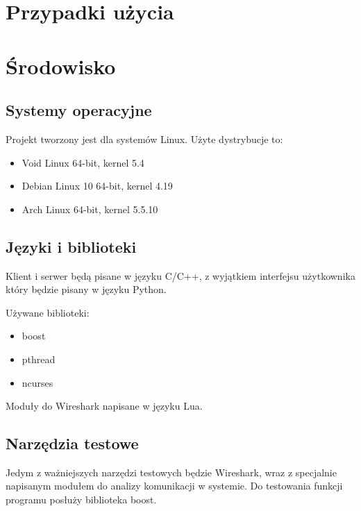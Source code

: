 \documentclass{article}
\begin{document}
\section{Przypadki użycia\label{przyp}}



\section{Środowisko\label{srod}}

\subsection{Systemy operacyjne}

Projekt tworzony jest dla systemów Linux. Użyte dystrybucje to:
\begin{itemize}

\item Void Linux 64-bit, kernel 5.4
\item Debian Linux 10 64-bit, kernel 4.19
\item Arch Linux 64-bit, kernel 5.5.10

\end{itemize}

\subsection{Języki i biblioteki}

Klient i serwer będą pisane w języku C/C++, z wyjątkiem interfejsu użytkownika który będzie pisany w języku Python.

Używane biblioteki:
\begin{itemize}

\item boost
\item pthread
\item ncurses
  
\end{itemize}


Moduły do Wireshark napisane w języku Lua.

\subsection{Narzędzia testowe}

Jedym z ważniejszych narzędzi testowych będzie Wireshark, wraz z specjalnie napisanym modułem do analizy komunikacji w systemie.
 Do testowania funkcji programu posłuży biblioteka boost.
\end{document}

